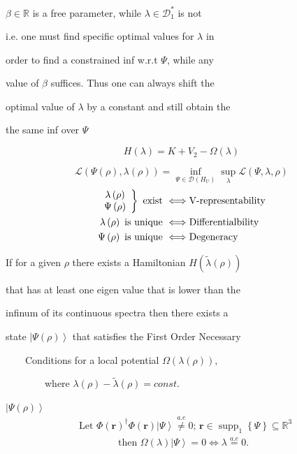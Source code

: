\documentclass[prl,twocolumn]{revtex4}%
\begin{document}
$\beta\in\mathbb{R}$ is a free parameter, while $\lambda\in\mathcal{D}%
_{1}^{\ast}$ is not

i.e. one must find specific optimal values for $\lambda$ in

order to find a constrained inf w.r.t $\Psi$, while any

value of $\beta$ suffices. Thus one can always shift the

optimal value of $\lambda$ by a constant and still obtain the

the same inf over $\Psi$%

\[
H\left(  \lambda\right)  =K+V_{2}-\Omega\left(  \lambda\right)
\]
%

\[
\mathcal{L}\left(  \Psi\left(  \rho\right)  ,\lambda\left(  \rho\right)
\right)  =\inf_{\Psi\in\mathcal{D}\left(  H_{U}\right)  }\sup_{\lambda
}\mathcal{L}\left(  \Psi,\lambda,\rho\right)
\]%
\begin{align*}
\left.
\begin{array}
[c]{c}%
\lambda\left(  \rho\right) \\
\Psi\left(  \rho\right)
\end{array}
\right\}  \text{ exist }  &  \Longleftrightarrow\text{V-representability}\\
\lambda\left(  \rho\right)  \text{ is unique }  &  \Longleftrightarrow
\text{Differentialbility}\\
\Psi\left(  \rho\right)  \text{ is unique }  &  \Longleftrightarrow
\text{Degeneracy}%
\end{align*}


\quad If for a given $\rho$ there exists a Hamiltonian $H\left(
\tilde{\lambda}\left(  \rho\right)  \right)  $

that has at least one eigen value that is lower than the

infinum of its continuous spectra then there exists a

state $\left\vert \Psi\left(  \rho\right)  \right\rangle $ that satisfies the
First Order Necessary

$\qquad$Conditions for a local potential $\Omega\left(  \lambda\left(
\rho\right)  \right)  ,$

\qquad$\qquad\qquad$where $\lambda\left(  \rho\right)  -\tilde{\lambda}\left(
\rho\right)  =const.$

$\left\vert \Psi\left(  \rho\right)  \right\rangle $
\begin{align*}
&  \text{Let }\Phi\left(  \mathbf{r}\right)  ^{\dagger}\Phi\left(
\mathbf{r}\right)  \left\vert \Psi\right\rangle \overset{a.e}{\neq
}0;\,\mathbf{r\in}\operatorname*{supp}\nolimits_{1}\left\{  \Psi\right\}
\mathbf{\subseteq}\mathbb{R}^{3}\\
&  \qquad\qquad\text{then }\Omega\left(  \lambda\right)  \left\vert
\Psi\right\rangle =0\Leftrightarrow\lambda\overset{a.e}{=}0.
\end{align*}
\end{document}
